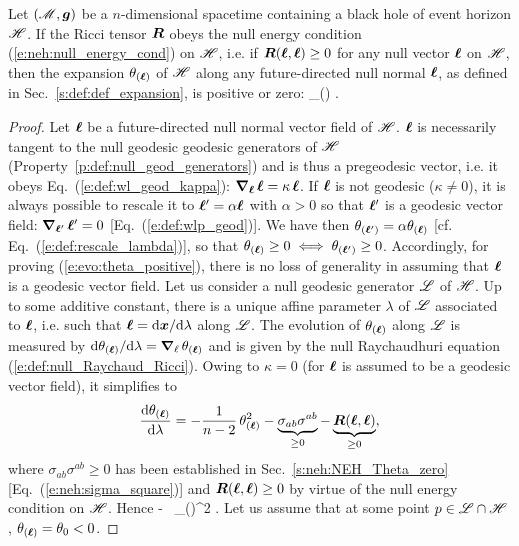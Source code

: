 \begin{prop}
Let $(\mathscr{M},\bm{g})$ be a $n$-dimensional spacetime containing a black hole
of event horizon $\mathscr{H}$. If the Ricci tensor $\bm{R}$ obeys the null
energy condition (\ref{e:neh:null_energy_cond}) on $\mathscr{H}$, i.e. if
$\bm{R}(\bm{\ell}, \bm{\ell}) \geq 0$ for any null vector $\bm{\ell}$ on $\mathscr{H}$, then the
expansion $\theta_{(\bm{\ell})}$ of $\mathscr{H}$ along any future-directed null
normal $\bm{\ell}$, as defined in Sec.~\ref{s:def:def_expansion}, is positive or zero:
\be \label{e:evo:theta_positive}
    \theta_{(\wl)}  .
\ee
\end{prop}
\begin{proof}
Let $\bm{\ell}$ be a future-directed null normal vector field of $\mathscr{H}$.
$\bm{\ell}$ is necessarily tangent to the null geodesic geodesic generators of $\mathscr{H}$
(Property~\ref{p:def:null_geod_generators}) and is thus a pregeodesic
vector, i.e. it obeys Eq.~(\ref{e:def:wl_geod_kappa}):
$\bm{\nabla}_{\bm{\ell}}\, \bm{\ell} = \kappa \, \bm{\ell} $.
If $\bm{\ell}$ is not geodesic ($\kappa\neq 0$), it is always possible to rescale it
to $\bm{\ell}' = \alpha \bm{\ell}$ with $\alpha > 0$ so that $\bm{\ell}'$ is a geodesic vector field:
$\bm{\nabla}_{\bm{\ell}'}\, \bm{\ell}' = 0$ [Eq.~(\ref{e:def:wlp_geod})].
We have then $\theta_{(\bm{\ell}')} = \alpha \theta_{(\bm{\ell})}$ [cf. Eq.~(\ref{e:def:rescale_lambda})],
so that $\theta_{(\bm{\ell})} \geq 0 \iff \theta_{(\bm{\ell}')} \geq 0$.
Accordingly, for proving (\ref{e:evo:theta_positive}), there is no loss of generality in assuming that
$\bm{\ell}$ is a geodesic vector field.
Let us consider a null geodesic generator $\mathscr{L}$ of $\mathscr{H}$. Up to some additive constant, there is
a unique affine parameter $\lambda$ of $\mathscr{L}$ associated to $\bm{\ell}$, i.e.  such that
$\bm{\ell} = \mathrm{d}\bm{x}/\mathrm{d}\lambda$ along $\mathscr{L}$. The evolution of
$\theta_{(\bm{\ell})}$ along $\mathscr{L}$
is measured by $\mathrm{d}\theta_{(\bm{\ell})}/\mathrm{d}\lambda = \bm{\nabla}_{\ell}\,  \theta_{(\bm{\ell})}$ and is given by
the null Raychaudhuri equation (\ref{e:def:null_Raychaud_Ricci}).
Owing to $\kappa=0$ (for $\bm{\ell}$ is assumed to be a geodesic vector field), it simplifies to
\[
    \frac{\mathrm{d} \theta_{(\bm{\ell})}}{\mathrm{d} \lambda}  =
        - \frac{1}{n-2} \, \theta_{(\bm{\ell})}^2
        - \underbrace{\sigma_{ab} \sigma^{ab}}_{\geq 0}
        - \underbrace{\bm{R}(\bm{\ell}, \bm{\ell})}_{\geq 0} ,
\]
where $\sigma_{ab} \sigma^{ab} \geq 0$ has been established in Sec.~\ref{s:neh:NEH_Theta_zero}
[Eq.~(\ref{e:neh:sigma_square})] and $\bm{R}(\bm{\ell}, \bm{\ell}) \geq 0$ by virtue of the null
energy condition on $\mathscr{H}$. Hence
\be \label{e:evo:der_theta_lower}
    \derd{\theta_{(\wl)}}{\lambda}  \leq
        -  \, \theta_{(\wl)}^2  .
\ee
Let us assume that at some point $p\in\mathscr{L}\cap\mathscr{H}$, $\theta_{(\bm{\ell})} = \theta_0 < 0$.

\end{proof}

